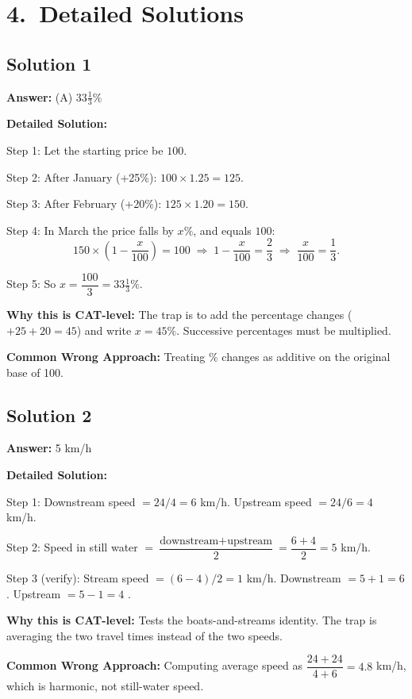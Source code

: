 \documentclass[11pt]{article}
\begin{document}
\newpage
\section*{4.\ Detailed Solutions}

\subsection*{Solution 1}
\textbf{Answer:} (A) \(33\tfrac{1}{3}\%\)

\textbf{Detailed Solution:}

Step 1: Let the starting price be \(100\).

Step 2: After January (+25\%): \(100 \times 1.25 = 125\).

Step 3: After February (+20\%): \(125 \times 1.20 = 150\).

Step 4: In March the price falls by \(x\%\), and equals \(100\):
\[
150 \times \left(1 - \frac{x}{100}\right) = 100 \;\Rightarrow\; 1 - \frac{x}{100} = \frac{2}{3} \;\Rightarrow\; \frac{x}{100} = \frac{1}{3}.
\]

Step 5: So \(x = \dfrac{100}{3} = 33\tfrac{1}{3}\%\).

\textbf{Why this is CAT-level:}
The trap is to add the percentage changes (\(+25 + 20 = 45\)) and write \(x = 45\%\). Successive percentages must be multiplied.

\textbf{Common Wrong Approach:}
Treating \(\%\) changes as additive on the original base of 100.

\subsection*{Solution 2}
\textbf{Answer:} 5 km/h

\textbf{Detailed Solution:}

Step 1: Downstream speed \(= 24/4 = 6\) km/h. Upstream speed \(= 24/6 = 4\) km/h.

Step 2: Speed in still water \(= \dfrac{\text{downstream} + \text{upstream}}{2} = \dfrac{6+4}{2} = 5\) km/h.

Step 3 (verify): Stream speed \(= (6-4)/2 = 1\) km/h. Downstream \(= 5+1 = 6\) \checkmark. Upstream \(= 5-1 = 4\) \checkmark.

\textbf{Why this is CAT-level:}
Tests the boats-and-streams identity. The trap is averaging the two travel times instead of the two speeds.

\textbf{Common Wrong Approach:}
Computing average speed as \(\dfrac{24+24}{4+6}=4.8\) km/h, which is harmonic, not still-water speed.
\end{document}
